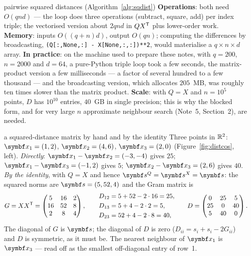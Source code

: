 \documentclass[11pt]{article}
\begin{document}
\begin{runtime}{pairwise squared distances (Algorithm~\ref{alg:sqdist})}
\textbf{Operations}: both need $O(qnd)$ --- the loop does three operations (subtract, square, add) per index triple;
the vectorised version about $2qnd$ in $QX^{\mathsf{T}}$ plus lower-order work. \textbf{Memory}: inputs $O((q + n)d)$, output
$O(qn)$; computing the differences by broadcasting, \texttt{(Q[:,None,:] - X[None,:,:])**2}, would materialise a
$q \times n \times d$ array. \textbf{In practice}: on the machine used to prepare these notes, with $q = 200$, $n = 2000$ and
$d = 64$, a pure-Python triple loop took a few seconds, the matrix-product version a few milliseconds --- a factor
of several hundred to a few thousand --- and the broadcasting version, which allocates $205$~MB, was roughly ten times
slower than the matrix product. \textbf{Scale}: with $Q = X$ and $n = 10^5$ points, $D$ has $10^{10}$ entries, $40$~GB
in single precision; this is why the blocked form, and for very large $n$ approximate neighbour search (Note~5,
Section~2), are needed.
\end{runtime}

\begin{worked}{a squared-distance matrix by hand and by the identity}
Three points in $\mathbb{R}^2$: $\x_1 = (1, 2)$, $\x_2 = (4, 6)$, $\x_3 = (2, 0)$ (Figure~\ref{fig:distcos}, left).
\emph{Directly}: $\x_1 - \x_2 = (-3, -4)$ gives $25$; $\x_1 - \x_3 = (-1, 2)$ gives $5$; $\x_2 - \x_3 = (2, 6)$ gives
$40$. \emph{By the identity}, with $Q = X$ and hence $\vect{s}^Q = \vect{s}^X = \vect{s}$: the squared norms are
$\vect{s} = (5, 52, 4)$ and the Gram matrix is
\[
  G = XX^{\mathsf{T}} = \begin{pmatrix} 5 & 16 & 2 \\ 16 & 52 & 8 \\ 2 & 8 & 4 \end{pmatrix}, \qquad
  \begin{aligned} D_{12} &= 5 + 52 - 2 \cdot 16 = 25, \\ D_{13} &= 5 + 4 - 2 \cdot 2 = 5, \\
  D_{23} &= 52 + 4 - 2 \cdot 8 = 40, \end{aligned} \qquad
  D = \begin{pmatrix} 0 & 25 & 5 \\ 25 & 0 & 40 \\ 5 & 40 & 0 \end{pmatrix}.
\]
The diagonal of $G$ is $\vect{s}$; the diagonal of $D$ is zero ($D_{ii} = s_i + s_i - 2G_{ii}$) and $D$ is symmetric, as it must be. The nearest
neighbour of $\x_1$ is $\x_3$ --- read off as the smallest off-diagonal entry of row~1.
\end{worked}
\end{document}
